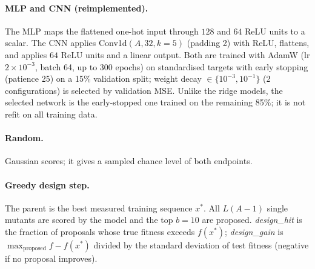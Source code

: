 \paragraph{MLP and CNN (reimplemented).} The MLP maps the flattened one-hot input through $128$ and $64$ ReLU units to a scalar. The CNN applies Conv1d$(A,32,k{=}5)$ (padding 2) with ReLU, flattens, and applies $64$ ReLU units and a linear output. Both are trained with AdamW (lr $2\times10^{-3}$, batch 64, up to 300 epochs) on standardised targets with early stopping (patience 25) on a 15\% validation split; weight decay $\in\{10^{-3},10^{-1}\}$ (2 configurations) is selected by validation MSE. Unlike the ridge models, the selected network is the early-stopped one trained on the remaining 85\%; it is not refit on all training data.

\paragraph{Random.} Gaussian scores; it gives a sampled chance level of both endpoints.

\paragraph{Greedy design step.} The parent is the best measured training sequence $x^\ast$. All $L(A-1)$ single mutants are scored by the model and the top $b=10$ are proposed. \emph{design\_hit} is the fraction of proposals whose true fitness exceeds $f(x^\ast)$; \emph{design\_gain} is $\max_{\text{proposed}}f-f(x^\ast)$ divided by the standard deviation of test fitness (negative if no proposal improves).
